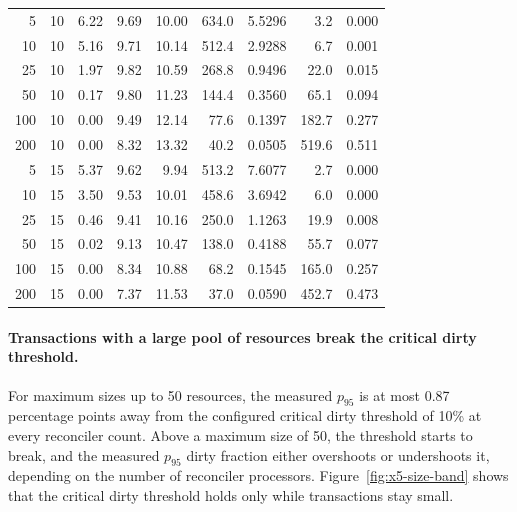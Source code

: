 \begin{table}[!htb]
\begin{tabular}{r r r r r r r r r}
    \\
    \midrule
    5       & 10          & 6.22          & 9.69          & 10.00         & 634.0
            & 5.5296      & 3.2           & 0.000
    \\
    10      & 10          & 5.16          & 9.71          & 10.14         & 512.4
            & 2.9288      & 6.7           & 0.001
    \\
    25      & 10          & 1.97          & 9.82          & 10.59         & 268.8
            & 0.9496      & 22.0          & 0.015
    \\
    50      & 10          & 0.17          & 9.80          & 11.23         & 144.4
            & 0.3560      & 65.1          & 0.094
    \\
    100     & 10          & 0.00          & 9.49          & 12.14         & 77.6
            & 0.1397      & 182.7         & 0.277
    \\
    200     & 10          & 0.00          & 8.32          & 13.32         & 40.2
            & 0.0505      & 519.6         & 0.511
    \\
    \midrule
    5       & 15          & 5.37          & 9.62          & 9.94          & 513.2
            & 7.6077      & 2.7           & 0.000
    \\
    10      & 15          & 3.50          & 9.53          & 10.01         & 458.6
            & 3.6942      & 6.0           & 0.000
    \\
    25      & 15          & 0.46          & 9.41          & 10.16         & 250.0
            & 1.1263      & 19.9          & 0.008
    \\
    50      & 15          & 0.02          & 9.13          & 10.47         & 138.0
            & 0.4188      & 55.7          & 0.077
    \\
    100     & 15          & 0.00          & 8.34          & 10.88         & 68.2
            & 0.1545      & 165.0         & 0.257
    \\
    200     & 15          & 0.00          & 7.37          & 11.53         & 37.0
            & 0.0590      & 452.7         & 0.473
    \\
    \bottomrule
  \end{tabular}
\end{table}

\paragraph{Transactions with a large pool of resources break the critical dirty
  threshold.}\label{sec:x5-invariance} For maximum sizes up to 50 resources, the
measured $p_{95}$ is at most 0.87 percentage points away from the configured
critical dirty threshold of 10\% at every reconciler count. Above a maximum
size of 50, the threshold starts to break, and the measured $p_{95}$ dirty
fraction either overshoots or undershoots it, depending on the number of
reconciler processors. Figure~\ref{fig:x5-size-band} shows that the critical
dirty threshold holds only while transactions stay small.

